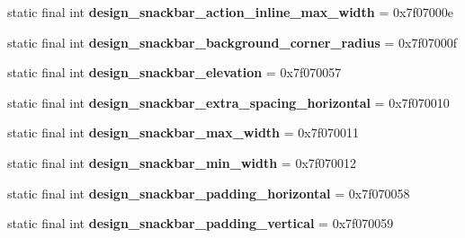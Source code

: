\begin{DoxyCompactItemize}
\item 
\hypertarget{classandroid_1_1support_1_1design_1_1_r_1_1dimen_a6ec8da0fd7402fc33d6180aff7258f88}{}static final int {\bfseries design\+\_\+snackbar\+\_\+action\+\_\+inline\+\_\+max\+\_\+width} = 0x7f07000e\label{classandroid_1_1support_1_1design_1_1_r_1_1dimen_a6ec8da0fd7402fc33d6180aff7258f88}

\item 
\hypertarget{classandroid_1_1support_1_1design_1_1_r_1_1dimen_a469c963201807723e61ebd63d9d31b30}{}static final int {\bfseries design\+\_\+snackbar\+\_\+background\+\_\+corner\+\_\+radius} = 0x7f07000f\label{classandroid_1_1support_1_1design_1_1_r_1_1dimen_a469c963201807723e61ebd63d9d31b30}

\item 
\hypertarget{classandroid_1_1support_1_1design_1_1_r_1_1dimen_a618410f7930e7304fc24480e003f2f48}{}static final int {\bfseries design\+\_\+snackbar\+\_\+elevation} = 0x7f070057\label{classandroid_1_1support_1_1design_1_1_r_1_1dimen_a618410f7930e7304fc24480e003f2f48}

\item 
\hypertarget{classandroid_1_1support_1_1design_1_1_r_1_1dimen_a9d7da239527c985b37edc815e1f67bd8}{}static final int {\bfseries design\+\_\+snackbar\+\_\+extra\+\_\+spacing\+\_\+horizontal} = 0x7f070010\label{classandroid_1_1support_1_1design_1_1_r_1_1dimen_a9d7da239527c985b37edc815e1f67bd8}

\item 
\hypertarget{classandroid_1_1support_1_1design_1_1_r_1_1dimen_ae088decd1622475be59b157ddd788bb6}{}static final int {\bfseries design\+\_\+snackbar\+\_\+max\+\_\+width} = 0x7f070011\label{classandroid_1_1support_1_1design_1_1_r_1_1dimen_ae088decd1622475be59b157ddd788bb6}

\item 
\hypertarget{classandroid_1_1support_1_1design_1_1_r_1_1dimen_ad801c273260b6b31c3f8b25b24888e31}{}static final int {\bfseries design\+\_\+snackbar\+\_\+min\+\_\+width} = 0x7f070012\label{classandroid_1_1support_1_1design_1_1_r_1_1dimen_ad801c273260b6b31c3f8b25b24888e31}

\item 
\hypertarget{classandroid_1_1support_1_1design_1_1_r_1_1dimen_a009e67819dc08e09556179677e7d7209}{}static final int {\bfseries design\+\_\+snackbar\+\_\+padding\+\_\+horizontal} = 0x7f070058\label{classandroid_1_1support_1_1design_1_1_r_1_1dimen_a009e67819dc08e09556179677e7d7209}

\item 
\hypertarget{classandroid_1_1support_1_1design_1_1_r_1_1dimen_a7fac1342910fbb66edd76b36ffb0040c}{}static final int {\bfseries design\+\_\+snackbar\+\_\+padding\+\_\+vertical} = 0x7f070059\label{classandroid_1_1support_1_1design_1_1_r_1_1dimen_a7fac1342910fbb66edd76b36ffb0040c}


\end{DoxyCompactItemize}
